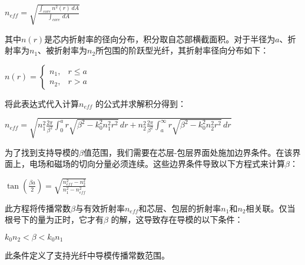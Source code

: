\documentclass[12pt, a4paper, oneside]{ctexart}
\begin{document}
\begin{spacing}{2.0}
$n_{eff} = \sqrt{\frac{\int_{core} n^2(r) \, dA}{\int_{core} \, dA}}$

其中$n(r)$是芯内折射率的径向分布，积分取自芯部横截面积。对于半径为$a$、折射率为$n_1$、被折射率为$n_2$所包围的阶跃型光纤，其折射率径向分布如下：

$n(r) = \begin{cases} n_1, & r \le a \\ n_2, & r > a \end{cases}$

将此表达式代入计算$n_{eff}$ 的公式并求解积分得到：

$n_{eff} = \sqrt{n_1^2 \frac{2\pi}{\beta^2}\int_0^a r \sqrt{\beta^2 - k_0^2 n_1^2 r^2} \, dr + n_2^2 \frac{2\pi}{\beta^2}\int_a^{\infty} r \sqrt{\beta^2 - k_0^2 n_2^2 r^2} \, dr}$

为了找到支持导模的$\beta$值范围，我们需要在芯层-包层界面处施加边界条件。在该界面上，电场和磁场的切向分量必须连续。这些边界条件导致以下方程式来计算$\beta$：

$\tan\left(\frac{\beta a}{2}\right) = \sqrt{\frac{n_{eff}^2 - n_2^2}{n_1^2 - n_{eff}^2}}$

此方程将传播常数$\beta$与有效折射率$n_{eff}$和芯层、包层的折射率$n_1$和$n_2$相关联。仅当根号下的量为正时，它才有$\beta$ 的解，这导致存在导模的以下条件：

$k_0 n_2 < \beta < k_0 n_1$

此条件定义了支持光纤中导模传播常数范围。
\end{spacing}{}



\end{document}
